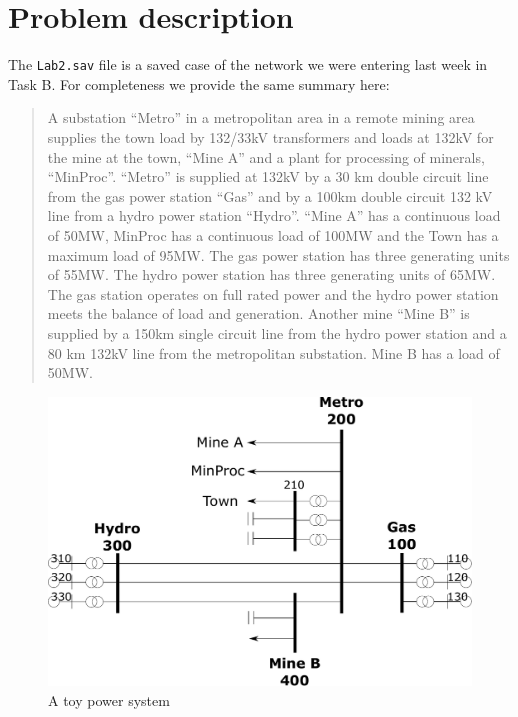 \documentclass[paper=a4, fontsize=11pt]{article}
\begin{document}
\section{Problem description}
The \texttt{Lab2.sav} file is a saved case of the network we were entering last week in Task B. For completeness we provide the same summary here:

\begin{quote}
A substation ``Metro'' in a metropolitan area in a remote mining area supplies the town load by 132/33kV transformers and loads at 132kV for the mine at the town, ``Mine A'' and a plant for processing of minerals, ``MinProc''. ``Metro'' is supplied at 132kV by a 30 km double circuit line from the gas power station ``Gas'' and by a 100km double circuit 132 kV line from a hydro power station ``Hydro''. ``Mine A'' has a continuous load of 50MW, MinProc has a continuous load of 100MW and the Town has a maximum load of 95MW. The gas power station has three generating units of 55MW. The hydro power station has three generating units of 65MW. The gas station operates on full rated power and the hydro power station meets the balance of load and generation. Another mine ``Mine B'' is supplied by a 150km single circuit line from the hydro power station and a 80 km 132kV line from the metropolitan substation. Mine B has a load of 50MW.
\end{quote}

\bigbreak

\begin{figure}[h]
\centering
\includegraphics[width=0.8\linewidth]{fig7_taskb.pdf}
\caption{A toy power system}
\label{fig:7}
\end{figure}
\end{document}
